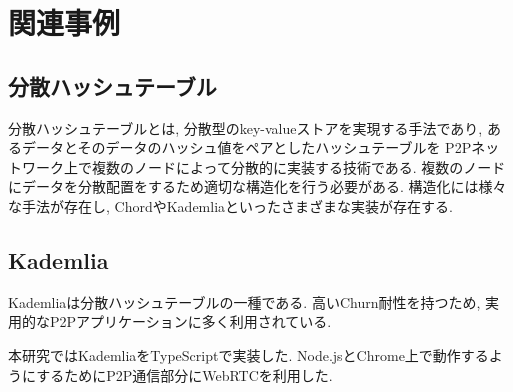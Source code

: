 \documentclass[sotsuron]{jcsie}
\begin{document}

\chapter{関連事例}
\section{分散ハッシュテーブル}
分散ハッシュテーブルとは, 分散型のkey-valueストアを実現する手法であり, 
あるデータとそのデータのハッシュ値をペアとしたハッシュテーブルを
P2Pネットワーク上で複数のノードによって分散的に実装する技術である.
複数のノードにデータを分散配置をするため適切な構造化を行う必要がある.
構造化には様々な手法が存在し, 
ChordやKademliaといったさまざまな実装が存在する.

\section{Kademlia}
Kademliaは分散ハッシュテーブルの一種である.
高いChurn耐性を持つため, 実用的なP2Pアプリケーションに多く利用されている.

本研究ではKademliaをTypeScriptで実装した.
Node.jsとChrome上で動作するようにするためにP2P通信部分にWebRTCを利用した.
\end{document}
